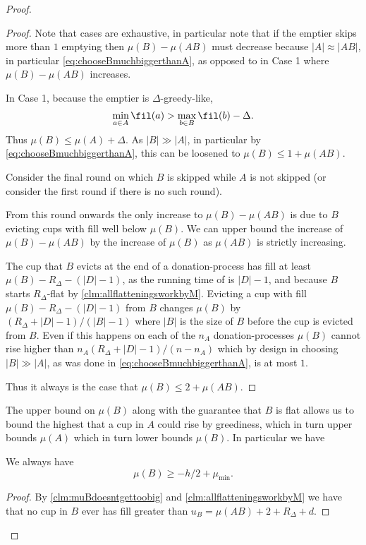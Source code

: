 \begin{proof}
\begin{proof}
  Note that cases are exhaustive, in particular note that if the
  emptier skips more than $1$ emptying then $\mu(B) - \mu(AB)$
  must decrease because $|A|\approx |AB|$, in particular
  \eqref{eq:chooseBmuchbiggerthanA}, as opposed to in Case 1
  where $\mu(B) - \mu(AB)$ increases.

  In Case 1, because the emptier is $\Delta$-greedy-like,
  $$\min_{a\in A} \fil(a) > \max_{b\in B} \fil(b) - \Delta.$$
  Thus $\mu(B) \le \mu(A) + \Delta$. As $|B| \gg |A|$, in
  particular by \eqref{eq:chooseBmuchbiggerthanA}, this can be
  loosened to $\mu(B) \le 1 + \mu(A B)$.

  Consider the final round on which $B$ is skipped while $A$ is
  not skipped (or consider the first round if there is no such
  round).

  From this round onwards the only increase to $\mu(B) - \mu(A
  B)$ is due to $B$ evicting cups with fill well below $\mu(B)$.
  We can upper bound the increase of $\mu(B) - \mu(A B)$ by the
  increase of $\mu(B)$ as $\mu(A B)$ is strictly increasing.

  The cup that $B$ evicts at the end of a
  donation-process has fill at least $\mu(B) - R_\Delta -
  (|D|-1)$, as the running time of \randalg is $|D|-1$, and
  because $B$ starts $R_\Delta$-flat by
  \cref{clm:allflatteningsworkbyM}. Evicting a cup
  with fill $\mu(B) - R_\Delta - (|D| -1)$ from $B$ changes
  $\mu(B)$ by $(R_\Delta + |D| - 1) / (|B|-1)$ where $|B|$ is the
  size of $B$ before the cup is evicted from $B$. Even if this
  happens on each of the $n_A$ donation-processes $\mu(B)$ cannot
  rise higher than $n_A (R_\Delta + |D|-1) / (n-n_A)$ which by
  design in choosing $|B| \gg |A|$, as was done in
  \eqref{eq:chooseBmuchbiggerthanA}, is at most $1$.

  Thus it always is the case that $\mu(B) \le 2 + \mu(A B).$

\end{proof}

The upper bound on $\mu(B)$ along with the guarantee that $B$ is
flat allows us to bound the highest that a cup in $A$ could rise
by greediness, which in turn upper bounds $\mu(A)$ which in turn
lower bounds $\mu(B)$. In particular we have
\begin{clm}
  \label{clm:muBgreaterthanminushover2}
  We always have
  $$\mu(B) \ge -h/2 + \mu_{\min}.$$
\end{clm}
\begin{proof}
  By \cref{clm:muBdoesntgettoobig} and \cref{clm:allflatteningsworkbyM} 
  we have that no cup in $B$ ever has fill greater than
  $u_B = \mu(A B) + 2 + R_\Delta + d$. 


\end{proof}
\end{proof}
